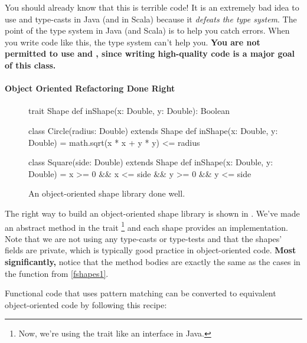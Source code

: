 \documentclass[9pt]{extbook}
\begin{document}
You should already know that this is terrible code! It is an extremely bad idea
to use  and type-casts in Java (and in Scala) because it
\emph{defeats the type system}. The point of the type system in Java (and Scala)
is to help you catch errors. When you write code like this, the type system
can't help you.
\textbf{You are not permitted to use  and ,
since writing high-quality code is a major goal of this class.}

\paragraph{Object Oriented Refactoring Done Right}

\begin{figure}
\begin{scalacode}
trait Shape {
  def inShape(x: Double, y: Double): Boolean
}

class Circle(radius: Double) extends Shape {
   def inShape(x: Double, y: Double) = math.sqrt(x * x + y * y) <= radius
}

class Square(side: Double) extends Shape {
  def inShape(x: Double, y: Double) = x >= 0 && x <= side && y >= 0 && y <= side
}
\end{scalacode}
\caption{An object-oriented shape library done well.}
\label{jshapes1}
\end{figure}

The right way to build an object-oriented shape library is shown in .
We've made
 an abstract method in the trait
\footnote{Now, we're using the trait like an interface
in Java.} and each shape provides
an implementation. Note that we are not using any type-casts or type-tests and
that the shapes' fields are private, which is typically good practice in
object-oriented code. \textbf{Most significantly,} notice that the method
bodies are exactly the same as the cases in the function from \cref{fshapes1}.

Functional code that uses pattern matching can be converted to equivalent
object-oriented code by following this recipe:
\end{document}
